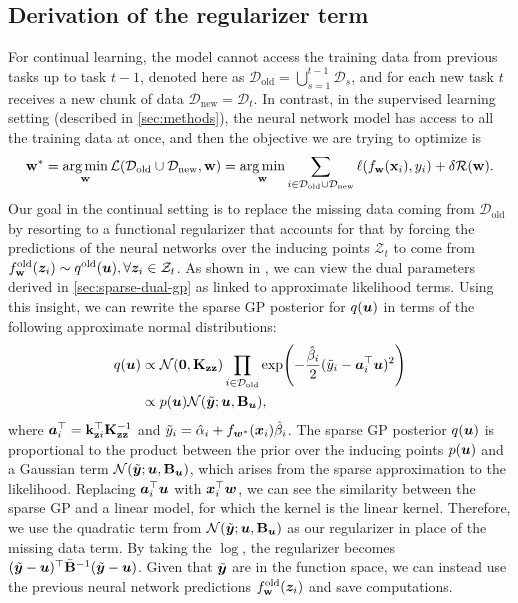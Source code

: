 \documentclass{article} %
\newcommand{\dataset}{\ensuremath{\mathcal{D}}}
\newcommand{\weights}{\ensuremath{\mathbf{w}}}
\newcommand{\mbf}[1]{\mathbf{#1}}
\newcommand{\MB}{\mbf{B}}
\newcommand{\MKzz}{\mbf{K}_{\mbf{z}\mbf{z}}}
\newcommand{\vkzi}{\mbf{k}_{\mbf{z}i}}
\newcommand{\Norm}{\mathcal{N}}
\begin{document}
\subsection{Derivation of the regularizer term}
For continual learning, the model cannot access the training data from previous tasks up to task $t-1$, denoted here as $\dataset_\textrm{old} = \bigcup_{s=1}^{t-1} \dataset_s$, and for each new task $t$ receives a new chunk of data $\dataset_\textrm{new} = \dataset_t$. In contrast, in the supervised learning setting (described in \cref{sec:methods}), the neural network model has access to all the training data at once, and then the objective we are trying to optimize is
\begin{equation}
	\weights^* = \argmin_\weights \mathcal{L}(\dataset_\textrm{old} \cup \dataset_\textrm{new}, \weights) = \argmin_\weights \sum_{i \in \dataset_\textrm{old} \cup \dataset_\textrm{new}}\ell(f_\weights(\mathbf{x}_{i}), y_i) + \delta \mathcal{R}(\weights).
\end{equation}
Our goal in the continual setting is to replace the missing data coming from $\dataset_\textrm{old}$ by resorting to a functional regularizer that accounts for that by forcing the predictions of the neural networks over the inducing points $\mathcal{Z}_t$ to come from $f^{\textrm{old}}_\weights(\vz_i) \sim q^\textrm{old}(\vu),  \forall \vz_i \in \mathcal{Z}_t$. As shown in \citep{khan2017conjugate, adam2021dual}, we can view the dual parameters derived in \cref{sec:sparse-dual-gp} as linked to approximate likelihood terms. Using this insight, we can rewrite the sparse GP posterior for $q({\bm{u}})$ in terms of the following approximate normal distributions:
%
\begin{align} \label{eq:normal}
	q(\vu)
	& \propto  \Norm(\mathbf{0}, \MKzz) \prod_{i \in \dataset_\textrm{old}} \exp \! \left(-\frac{\hat{\beta}_i}{2}(\tilde{y}_i - \va_i^\top \vu)^2 \right) \\
        & \propto p(\vu) \Norm(\tilde{\vy}; \vu, \MB_\vu),
\end{align}
where $\va_i^\top = \vkzi^\top \MKzz^{-1}$ and $\tilde{y}_i = \hat{\alpha}_i + f_{{\bm{w}}^*}({\bm{x}}_i)\hat{\beta}_i$.
The sparse GP posterior $q({\bm{u}})$ is proportional to the product between the prior over the inducing points $p({\bm{u}})$ and a Gaussian term $\Norm(\tilde{\vy}; \vu, \MB_\vu)$, which arises from the sparse approximation to the likelihood. Replacing ${\bm{a}}_i^\top {\bm{u}}$ with ${\bm{x}}_i^{\top}{\bm{w}}$, we can see the similarity between the sparse GP and a linear model, for which the kernel is the linear kernel. Therefore, we use the quadratic term from  $\Norm(\tilde{\vy}; \vu, \MB_\vu)$ as our regularizer in place of the missing data term. By taking the $\log$, the regularizer becomes $(\tilde{\vy} - \vu)^\top \bar{\MB}^{-1}(\tilde{\vy} - \vu)$.  Given that $\tilde{{\bm{y}}}$ are in the function space, we can instead use the previous neural network predictions $f^{\textrm{old}}_\weights(\vz_i)$ and save computations.
\end{document}
